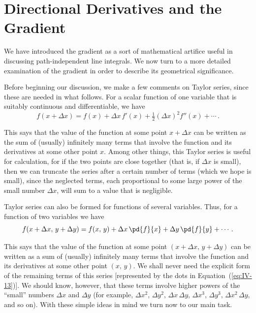 \section{Directional Derivatives and the Gradient}

We have introduced the gradient as a sort of mathematical artifice
useful in discussing path-independent line integrals.  We now turn
to a more detailed examination of the gradient in order to describe
its geometrical significance.

Before beginning our discussion, we make a few comments on
Taylor series, since these are needed in what follows.  For a scalar
function of one variable that is suitably continuous and
differentiable, we have
\[
f(x + \Delta x) = f(x) + \Delta x\,f'(x)
+ \tfrac{1}{2}(\Delta x)^2 f''(x) + \cdots\,.
\]

This says that the value of the function at some point
$x + \Delta x$ can be written as the sum of (usually) infinitely many
terms that involve the function and its derivatives at some other
point $x$.  Among other things, this Taylor series is useful for
calculation, for if the two points are close together (that is, if
$\Delta x$ is small), then we can truncate the series after a certain
number of terms (which we hope is small), since the neglected
terms, each proportional to some large power of the small number
$\Delta x$, will sum to a value that is negligible.

Taylor series can also be formed for functions of several
variables.  Thus, for a function of two variables we have
\begin{equation}
f(x + \Delta x,\,y + \Delta y)
= f(x,\,y) + \Delta x\,\pd{f}{x} + \Delta y\,\pd{f}{y} + \cdots\,.
\label{eq:IV-13}
\end{equation}

This says that the value of the function at some point
$(x + \Delta x,\,y + \Delta y)$ can be written as a sum of (usually)
infinitely many terms that involve the function and its derivatives at
some other point $(x,\,y)$.  We shall never need the explicit form of
the remaining terms of this series [represented by the dots in
Equation~(\ref{eq:IV-13})].  We should know, however, that these
terms involve higher powers of the ``small'' numbers $\Delta x$ and
$\Delta y$ (for example, $\Delta x^2$, $\Delta y^2$,
$\Delta x\,\Delta y$, $\Delta x^3$, $\Delta y^3$,
$\Delta x^2\,\Delta y$, and so on).  With these simple ideas in mind
we turn now to our main task.

